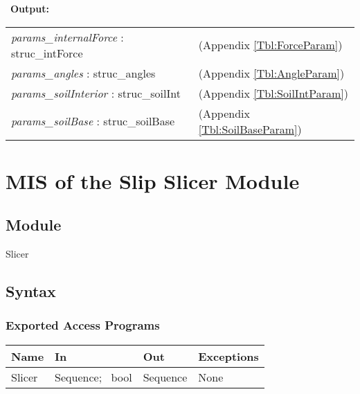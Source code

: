 \documentclass[12pt, titlepage]{article}
\begin{document}
~\newline\noindent \textbf{Output:}
\renewcommand*{\arraystretch}{1.5}
\begin{longtable}{p{} p{}}
  \textit{params\_internalForce} : struc\_intForce & (Appendix
  \ref{Tbl:ForceParam})\\
  
  \textit{params\_angles} : struc\_angles & (Appendix \ref{Tbl:AngleParam})\\

  \textit{params\_soilInterior} : struc\_soilInt & (Appendix
  \ref{Tbl:SoilIntParam})\\

  \textit{params\_soilBase} : struc\_soilBase & (Appendix
  \ref{Tbl:SoilBaseParam})\\
\end{longtable}


\section{MIS of the Slip Slicer Module} \label{sec:SlicerMod}

\subsection{Module}
Slicer

\subsection{Syntax}

\subsubsection{Exported Access Programs}
\begin{center}
\renewcommand*{\arraystretch}{1.5}
\begin{tabular}{| p{} | p{} | 
  p{} | p{} |} \hline 
  \textbf{Name} & \textbf{In} & \textbf{Out} & \textbf{Exceptions}
  \\ \hline

  Slicer & Sequence; ~\newline bool & Sequence & None \\ \hline

\end{tabular}
\end{center}
\end{document}
